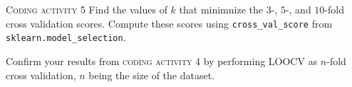\documentclass{beamer}
\begin{document}
\begin{frame}{\textsc{Coding activity 5}}
    Find the values of $k$ that minimnize the $3$-, $5$-, and $10$-fold cross validation scores.
    Compute these scores using \texttt{cross\_val\_score} from \texttt{sklearn.model\_selection}.
    
    Confirm your results from \textsc{coding activity 4} by performing LOOCV as 
    $n$-fold cross validation, $n$ being the size of the dataset.
\end{frame}
\end{document}
